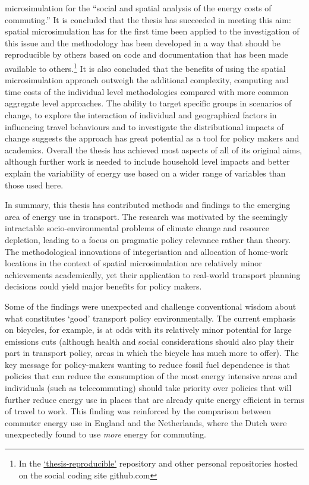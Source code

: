 \documentclass[a4paper, 11pt, twoside]{Thesis}
\begin{document}
microsimulation for the ``social and spatial analysis of the energy costs of
commuting.'' It is concluded that the thesis has succeeded in meeting this aim:
spatial microsimulation has for the first time been applied to the
investigation of this issue and the methodology has been developed in a way
that should be reproducible by others based on code and documentation that has
been made available to others.\footnote{In
the
{\color{blue}\href{https://github.com/Robinlovelace/thesis-reproducible}
{`thesis-reproducible'}} repository
and other personal repositories hosted on the social coding site github.com
}
It is also concluded that the benefits of using the spatial microsimulation
approach outweigh the additional complexity, computing and time costs of the
individual level methodologies compared with more common aggregate level
approaches. The ability to target specific groups in scenarios of change, to
explore the interaction of individual and geographical factors in influencing
travel behaviours and to investigate the distributional impacts of change
suggests the approach has great potential as a tool for policy makers and
academics. Overall the thesis has achieved most aspects of all of its original
aims, although further work is needed to include household level impacts and
better explain the variability of energy use based on a wider range of
variables than those used here.

In summary, this thesis has contributed methods and findings to the emerging
area of energy use in transport. The research was motivated by the seemingly
intractable socio-environmental problems of climate change and resource
depletion, leading to a focus on pragmatic policy relevance rather than theory.
The methodological innovations of integerisation and allocation of home-work
locations in the context of spatial microsimulation are relatively minor
achievements academically, yet their application to real-world transport
planning decisions could yield major benefits for policy makers.

Some of the findings were unexpected and challenge conventional wisdom about
what constitutes `good' transport policy environmentally. The current
emphasis on bicycles, for example, is at odds with its relatively
minor potential for large emissions cuts (although health and social
considerations should also play their part in transport policy, areas
in which the bicycle has much more to offer).
The key message for policy-makers wanting to reduce fossil fuel dependence
is that policies that can reduce the consumption
of the most energy intensive areas and individuals (such as telecommuting)
should take priority over policies that will further reduce energy use in
places that are already quite energy efficient in terms of travel to work.
This finding was reinforced by the comparison between 
commuter energy use in England and the Netherlands, where the Dutch were
unexpectedly found to use \emph{more} energy for commuting. 
\end{document}
